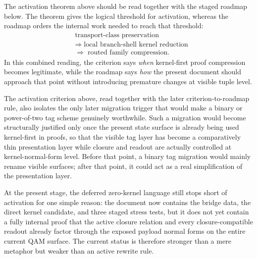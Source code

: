 \begin{remark}\label{rem:qam-zero-kernel-criterion-roadmap}
The activation theorem above should be read together with the staged roadmap below. The theorem gives the logical threshold for activation, whereas the roadmap orders the internal work needed to reach that threshold:
\[
\begin{aligned}
&\text{transport-class preservation}\\[0.15em]
&\Longrightarrow\;\text{local branch-shell kernel reduction}\\[0.15em]
&\Longrightarrow\;\text{routed family compression}.
\end{aligned}
\]
In this combined reading, the criterion says \emph{when} kernel-first proof compression becomes legitimate, while the roadmap says \emph{how} the present document should approach that point without introducing premature changes at visible tuple level.
\end{remark}

\begin{remark}\label{rem:qam-zero-kernel-migration-trigger}
The activation criterion above, read together with the later criterion-to-roadmap rule, also isolates the only later migration trigger that would make a binary or power-of-two tag scheme genuinely worthwhile. Such a migration would become structurally justified only once the present state surface is already being used kernel-first in proofs, so that the visible tag layer has become a comparatively thin presentation layer while closure and readout are actually controlled at kernel-normal-form level. Before that point, a binary tag migration would mainly rename visible surfaces; after that point, it could act as a real simplification of the presentation layer.
\end{remark}

\begin{remark}\label{rem:qam-zero-kernel-activation-gap}
At the present stage, the deferred zero-kernel language still stops short of activation for one simple reason: the document now contains the bridge data, the direct kernel candidate, and three staged stress tests, but it does not yet contain a fully internal proof that the active closure relation and every closure-compatible readout already factor through the exposed payload normal forms on the entire current QAM surface. The current status is therefore stronger than a mere metaphor but weaker than an active rewrite rule.
\end{remark}



